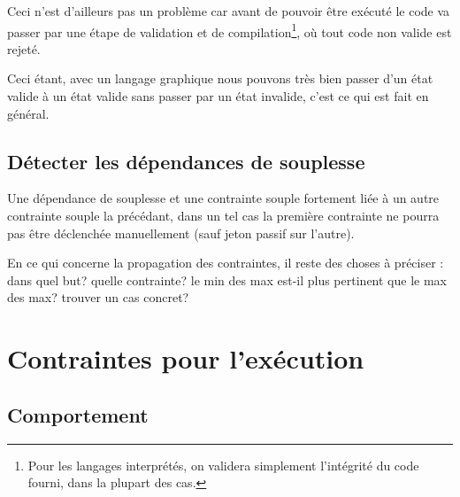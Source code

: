 Ceci n'est d'ailleurs pas un problème car avant de pouvoir être exécuté le code va passer par une étape de validation et de compilation\footnote{Pour les langages interprétés, on validera simplement l'intégrité du code fourni, dans la plupart des cas.}, où tout code non valide est rejeté.


Ceci étant, avec un langage graphique nous pouvons très bien passer d'un état valide à un état valide sans passer par un état invalide, c'est ce qui est fait en général.%



\subsection{Détecter les dépendances de souplesse}

Une dépendance de souplesse et une contrainte souple fortement liée à un autre contrainte souple la précédant, dans un tel cas la première contrainte ne pourra pas être déclenchée manuellement (sauf jeton passif sur l'autre).


En ce qui concerne la propagation des contraintes, il reste des choses à préciser :
dans quel but?
quelle contrainte?
le min des max est-il plus pertinent que le max des max?
trouver un cas concret?

\section{Contraintes pour l'exécution}

\subsection{Comportement}%


